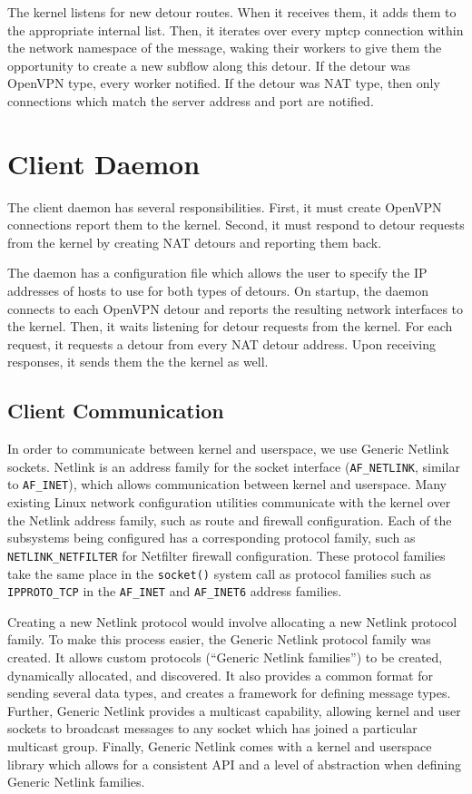 \documentclass{cwru}
\begin{document}
The kernel listens for new detour routes. When it receives them, it adds them to
the appropriate internal list. Then, it iterates over every \ac{mptcp} connection
within the network namespace of the message, waking their workers to give them
the opportunity to create a new subflow along this detour. If the detour was
OpenVPN type, every worker notified. If the detour was NAT type, then only
connections which match the server address and port are notified.

\section{Client Daemon}

The client daemon has several responsibilities. First, it must create OpenVPN
connections report them to the kernel. Second, it must respond to detour
requests from the kernel by creating NAT detours and reporting them back.

The daemon has a configuration file which allows the user to specify the IP
addresses of hosts to use for both types of detours. On startup, the daemon
connects to each OpenVPN detour and reports the resulting network interfaces to
the kernel. Then, it waits listening for detour requests from the kernel. For
each request, it requests a detour from every NAT detour address. Upon receiving
responses, it sends them the the kernel as well.

\subsection{Client Communication}

In order to communicate between kernel and userspace, we use Generic Netlink
sockets. Netlink is an address family for the socket interface
(\texttt{AF\_NETLINK}, similar to \texttt{AF\_INET}), which allows communication
between kernel and userspace. Many existing Linux network configuration
utilities communicate with the kernel over the Netlink address family, such as
route and firewall configuration. Each of the subsystems being configured has a
corresponding protocol family, such as \texttt{NETLINK\_NETFILTER} for Netfilter
firewall configuration. These protocol families take the same place in the
\texttt{socket()} system call as protocol families such as \texttt{IPPROTO\_TCP}
in the \texttt{AF\_INET} and \texttt{AF\_INET6} address families.

Creating a new Netlink protocol would involve allocating a new Netlink protocol
family. To make this process easier, the Generic Netlink protocol family was
created. It allows custom protocols (``Generic Netlink families'') to be
created, dynamically allocated, and discovered. It also provides a common format
for sending several data types, and creates a framework for defining message
types. Further, Generic Netlink provides a multicast capability, allowing kernel
and user sockets to broadcast messages to any socket which has joined a
particular multicast group. Finally, Generic Netlink comes with a kernel and
userspace library which allows for a consistent API and a level of abstraction
when defining Generic Netlink families.
\end{document}
